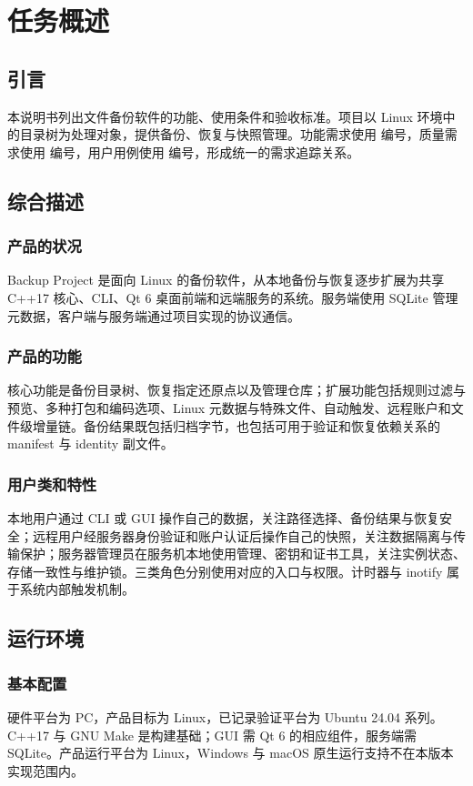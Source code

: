 \section{任务概述}
\subsection{引言}
本说明书列出文件备份软件的功能、使用条件和验收标准。项目以 Linux 环境中的目录树为处理对象，提供备份、恢复与快照管理。功能需求使用  编号，质量需求使用  编号，用户用例使用  编号，形成统一的需求追踪关系。

\subsection{综合描述}
\subsubsection{产品的状况}
Backup Project 是面向 Linux 的备份软件，从本地备份与恢复逐步扩展为共享 C++17 核心、CLI、Qt 6 桌面前端和远端服务的系统。服务端使用 SQLite 管理元数据，客户端与服务端通过项目实现的协议通信。

\subsubsection{产品的功能}
核心功能是备份目录树、恢复指定还原点以及管理仓库；扩展功能包括规则过滤与预览、多种打包和编码选项、Linux 元数据与特殊文件、自动触发、远程账户和文件级增量链。备份结果既包括归档字节，也包括可用于验证和恢复依赖关系的 manifest 与 identity 副文件。

\subsubsection{用户类和特性}
本地用户通过 CLI 或 GUI 操作自己的数据，关注路径选择、备份结果与恢复安全；远程用户经服务器身份验证和账户认证后操作自己的快照，关注数据隔离与传输保护；服务器管理员在服务机本地使用管理、密钥和证书工具，关注实例状态、存储一致性与维护锁。三类角色分别使用对应的入口与权限。计时器与 inotify 属于系统内部触发机制。

\subsection{运行环境}
\subsubsection{基本配置}
硬件平台为 PC，产品目标为 Linux，已记录验证平台为 Ubuntu 24.04 系列。C++17 与 GNU Make 是构建基础；GUI 需 Qt 6 的相应组件，服务端需 SQLite。产品运行平台为 Linux，Windows 与 macOS 原生运行支持不在本版本实现范围内。
